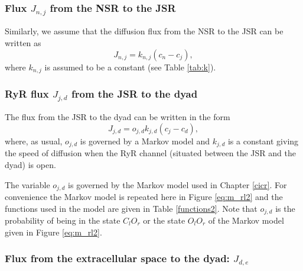 \subsubsection{Flux $J_{n,j}$ from the NSR to the JSR}
Similarly, we assume that the diffusion flux from the NSR to the JSR can be written as
\begin{equation}
J_{n,j}=k_{n,j}\left(  c_{n}-c_{j}\right), \label{J_nj}
\end{equation}
where $k_{n,j}$ is assumed to be a constant (see Table \ref{tab:k}).

\subsubsection{RyR flux $J_{j,d}$ from the JSR to the dyad}
The
flux from the JSR to the dyad can be written in the form
\begin{equation}
J_{j,d}=o_{j,d}k_{j,d}\left(  c_{j}-c_{d}\right), \label{J_jd}
\end{equation}
where, as usual, $o_{j,d}$ is governed by a Markov model and $k_{j,d}$ is a
constant giving the speed of diffusion when the RyR channel (situated between
the JSR and the dyad) is open.

The variable $o_{j,d}$ is governed by the Markov model
used in Chapter \ref{cicr}. For convenience the Markov model is repeated here in Figure \ref{eq:m_rl2} and  the functions
used in the model are given in Table \ref{functions2}. Note that $o_{j,d}$ is the probability of being in the state $C_lO_r$ or the state $O_lO_r$ of the Markov model given in Figure \ref{eq:m_rl2}.





\subsubsection{Flux from the extracellular space to the dyad: $J_{d,e}$}

